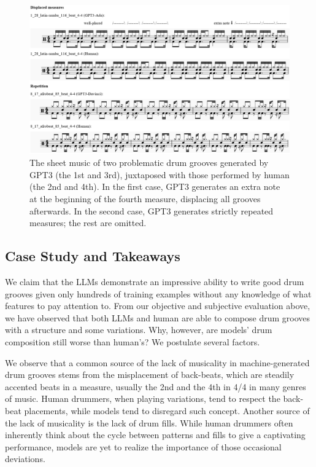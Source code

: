\documentclass[letterpaper]{article} %
\begin{document}
\begin{figure}
    \centering
    \includegraphics[scale=0.48]{images/bad_example.png}
    \caption{The sheet music of two problematic drum grooves generated by GPT3 (the 1st and 3rd), juxtaposed with those performed by human (the 2nd and 4th). In the first case, GPT3 generates an extra note at the beginning of the fourth measure, displacing all grooves afterwards. In the second case, GPT3 generates strictly repeated measures; the rest are omitted.}
    \label{fig:bad_example}
\end{figure}

\subsection{Case Study and Takeaways}
We claim that the LLMs demonstrate an impressive ability to write good drum grooves given only hundreds of training examples without any knowledge of what features to pay attention to. From our objective and subjective evaluation above, we have observed that both LLMs and human are able to compose drum grooves with a structure and some variations. Why, however, are models' drum composition still worse than human's? We postulate several factors.

We observe that a common source of the lack of musicality in machine-generated drum grooves stems from the misplacement of back-beats, which are steadily accented beats in a measure, usually the 2nd and the 4th in 4/4 in many genres of music. Human drummers, when playing variations, tend to respect the back-beat placements, while models tend to disregard such concept. Another source of the lack of musicality is the lack of drum fills. While human drummers often inherently think about the cycle between patterns and fills to give a captivating performance, models are yet to realize the importance of those occasional deviations.
\end{document}
